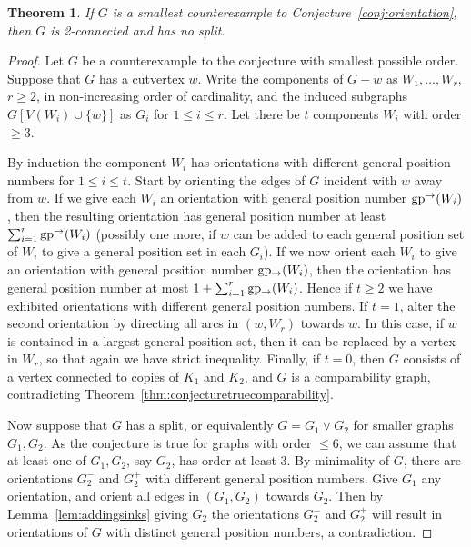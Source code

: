 \documentclass[a4paper,12pt]{article}
\newtheorem{theorem}{Theorem}[section]
\theoremstyle{definition}
\newcommand{\ugp}{{\rm gp^{\rightarrow }}}
\newcommand{\lgp}{{\rm gp_{\rightarrow }}}
\begin{document}
	\begin{theorem}
		If $G$ is a smallest counterexample to Conjecture~\ref{conj:orientation}, then $G$ is 2-connected and has no split.
	\end{theorem}
	\begin{proof}
		Let $G$ be a counterexample to the conjecture with smallest possible order. Suppose that $G$ has a cutvertex $w$. Write the components of $G-w$ as $W_1,\ldots ,W_r$, $r \geq 2$, in non-increasing order of cardinality, and the induced subgraphs $G[V(W_i)\cup \{ w\} ]$ as $G_i$ for $1 \leq i \leq r$. Let there be $t$ components $W_i$ with order $\geq 3$.
		
		By induction the component $W_i$ has orientations with different general position numbers for $1 \leq i \leq t$. Start by orienting the edges of $G$ incident with $w$ away from $w$. If we give each $W_i$ an orientation with general position number $\ugp (W_i)$, then the resulting orientation has general position number at least $\sum _{i=1}^r\ugp (W_i)$ (possibly one more, if $w$ can be added to each general position set of $W_i$ to give a general position set in each $G_i$). If we now orient each $W_i$ to give an orientation with general position number $\lgp (W_i)$, then the orientation has general position number at most $1+\sum _{i=1}^r\lgp (W_i)$. Hence if $t \geq 2$ we have exhibited orientations with different general position numbers. If $t = 1$, alter the second orientation by directing all arcs in $(w,W_r)$ towards $w$. In this case, if $w$ is contained in a largest general position set, then it can be replaced by a vertex in $W_r$, so that again we have strict inequality. Finally, if $t = 0$, then $G$ consists of a vertex connected to copies of $K_1$ and $K_2$, and $G$ is a comparability graph, contradicting Theorem~\ref{thm:conjecturetruecomparability}. 
		
		Now suppose that $G$ has a split, or equivalently $G = G_1 \vee G_2$ for smaller graphs $G_1,G_2$. As the conjecture is true for graphs with order $\leq 6$, we can assume that at least one of $G_1,G_2$, say $G_2$, has order at least 3. By minimality of $G$, there are orientations $G_2^-$ and $G_2^+$ with different general position numbers. Give $G_1$ any orientation, and orient all edges in $(G_1,G_2)$ towards $G_2$. Then by Lemma~\ref{lem:addingsinks} giving $G_2$ the orientations $G_2^-$ and $G_2^+$ will result in orientations of $G$ with distinct general position numbers, a contradiction.
	\end{proof}
	
\end{document}
